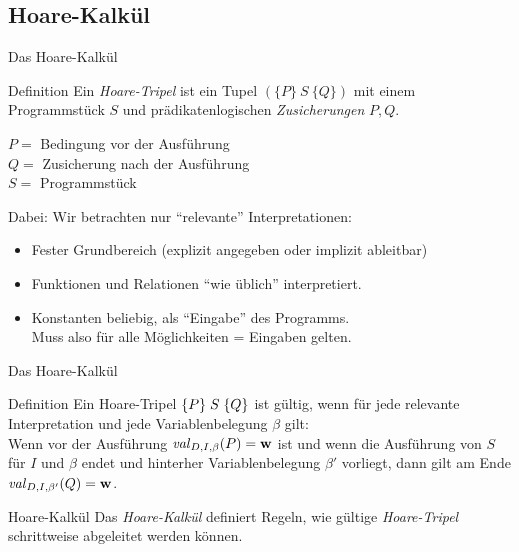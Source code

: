 \subsection{Hoare-Kalkül}
\begin{frame}{Das Hoare-Kalkül}
	\begin{block}{Definition}
		Ein \emph{Hoare-Tripel} ist ein Tupel $(\{P\}\ S\ \{Q\})$ mit einem Programmstück $S$ und prädikatenlogischen \emph{Zusicherungen} $P,Q$.
	\end{block}
	\pause
	$P = $ Bedingung vor der Ausführung \\
	$Q = $ Zusicherung nach der Ausführung\\
	$S = $ Programmstück
	
	\pause
	\bigskip
	Dabei: Wir betrachten nur \enquote{relevante} Interpretationen:
	\begin{itemize}[<+->]
		\item Fester Grundbereich (explizit angegeben oder implizit ableitbar)
		\item Funktionen und Relationen \enquote{wie üblich} interpretiert.
		\item Konstanten beliebig, als \enquote{Eingabe} des Programms.\\
		Muss also für alle Möglichkeiten = Eingaben gelten.
	\end{itemize}
\end{frame}

\begin{frame}{Das Hoare-Kalkül}
	\begin{block}{Definition}
		Ein Hoare-Tripel $\{P\}\;S\; \{Q\}$ ist gültig, wenn für jede relevante Interpretation und jede Variablenbelegung $\beta$ gilt:\\
		Wenn vor der Ausführung $\hbox{\textit{val}}_{D,I,\beta}(P)=\hbox{\textbf{w}}$ ist und wenn die Ausführung von $S$ für $I$ und $\beta$ endet und hinterher Variablenbelegung $\beta'$ vorliegt, dann gilt am Ende $\hbox{\textit{val}}_{D,I,\beta'}(Q)=\hbox{\textbf{w}}$.
	\end{block}

	\pause
	\begin{block}{Hoare-Kalkül}
		Das \emph{Hoare-Kalkül} definiert Regeln, wie gültige \emph{Hoare-Tripel} schrittweise abgeleitet werden können.
	\end{block}
\end{frame}


